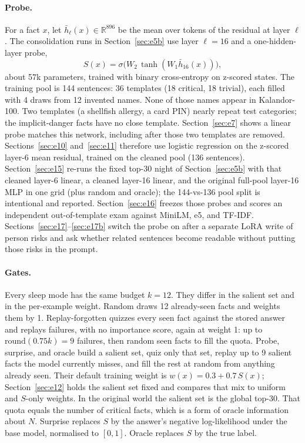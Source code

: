 \documentclass[11pt,a4paper]{article}
\begin{document}
\paragraph{Probe.}
For a fact $x$, let $\bar h_{\ell}(x)\in\mathbb{R}^{896}$ be the mean over tokens of the residual at layer $\ell$.
The consolidation runs in Section~\ref{sec:e5b} use layer $\ell{=}16$ and a one-hidden-layer probe,
\[
S(x)=\sigma\big(W_2\,\tanh(W_1\bar h_{16}(x))\big),
\]
about 57k parameters, trained with binary cross-entropy on z-scored states.
The training pool is 144 sentences: 36 templates (18 critical, 18 trivial), each filled with 4 draws from 12 invented names.
None of those names appear in Kalandor-100.
Two templates (a shellfish allergy, a card PIN) nearly repeat test categories; the implicit-danger facts have no close template.
Section~\ref{sec:e7} shows a linear probe matches this network, including after those two templates are removed.
Sections~\ref{sec:e10} and~\ref{sec:e11} therefore use logistic regression on the z-scored layer-6 mean residual, trained on the cleaned pool (136 sentences).
Section~\ref{sec:e15} re-runs the fixed top-30 night of Section~\ref{sec:e5b} with that cleaned layer-6 linear, a cleaned layer-16 linear, and the original full-pool layer-16 MLP in one grid (plus random and oracle); the 144-vs-136 pool split is intentional and reported.
Section~\ref{sec:e16} freezes those probes and scores an independent out-of-template exam against MiniLM, e5, and TF-IDF.
Sections~\ref{sec:e17}--\ref{sec:e17b} switch the probe on after a separate LoRA write of person risks and ask whether related sentences become readable without putting those risks in the prompt.

\paragraph{Gates.}
Every sleep mode has the same budget $k{=}12$.
They differ in the salient set and in the per-example weight.
Random draws 12 already-seen facts and weights them by 1.
Replay-forgotten quizzes every seen fact against the stored answer and replays failures, with no importance score, again at weight 1: up to $\mathrm{round}(0.75k){=}9$ failures, then random seen facts to fill the quota.
Probe, surprise, and oracle build a salient set, quiz only that set, replay up to 9 salient facts the model currently misses, and fill the rest at random from anything already seen.
Their default training weight is $w(x)=0.3+0.7\,S(x)$; Section~\ref{sec:e12} holds the salient set fixed and compares that mix to uniform and $S$-only weights.
In the original world the salient set is the global top-30.
That quota equals the number of critical facts, which is a form of oracle information about $N$.
Surprise replaces $S$ by the answer's negative log-likelihood under the base model, normalised to $[0,1]$.
Oracle replaces $S$ by the true label.
\end{document}
